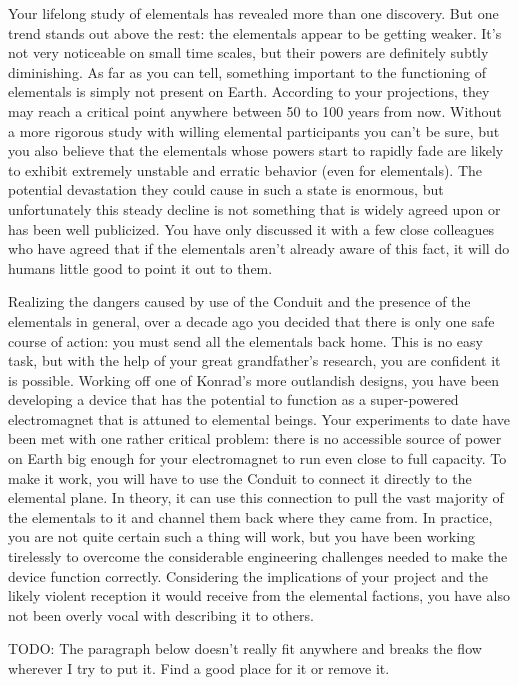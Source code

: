 \documentclass[char]{elementals}
\begin{document}
Your lifelong study of elementals has revealed more than one discovery. But one trend stands out above the rest: the elementals appear to be getting weaker. It's not very noticeable on small time scales, but their powers are definitely subtly diminishing. As far as you can tell, something important to the functioning of elementals is simply not present on Earth. According to your projections, they may reach a critical point anywhere between 50 to 100 years from now. Without a more rigorous study with willing elemental participants you can't be sure, but you also believe that the elementals whose powers start to rapidly fade are likely to exhibit extremely unstable and erratic behavior (even for elementals). The potential devastation they could cause in such a state is enormous, but unfortunately this steady decline is not something that is widely agreed upon or has been well publicized. You have only discussed it with a few close colleagues who have agreed that if the elementals aren't already aware of this fact, it will do humans little good to point it out to them.

Realizing the dangers caused by use of the Conduit and the presence of the elementals in general, over a decade ago you decided that there is only one safe course of action: you must send all the elementals back home. This is no easy task, but with the help of your great grandfather's research, you are confident it is possible. Working off one of Konrad's more outlandish designs, you have been developing a device that has the potential to function as a super-powered electromagnet that is attuned to elemental beings. Your experiments to date have been met with one rather critical problem: there is no accessible source of power on Earth big enough for your electromagnet to run even close to full capacity. To make it work, you will have to use the Conduit to connect it directly to the elemental plane. In theory, it can use this connection to pull the vast majority of the elementals to it and channel them back where they came from. In practice, you are not quite certain such a thing will work, but you have been working tirelessly to overcome the considerable engineering challenges needed to make the device function correctly. Considering the implications of your project and the likely violent reception it would receive from the elemental factions, you have also not been overly vocal with describing it to others.

TODO: The paragraph below doesn't really fit anywhere and breaks the flow wherever I try to put it. Find a good place for it or remove it.
\end{document}
